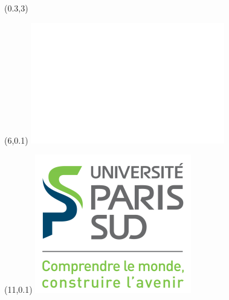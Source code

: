 \documentclass[a4paper]{article}
\newcommand{\NNT}{20XXSACLXXXX} 															%
\newcommand{\vpos}{0.1}																	%
\newcommand{\hpos}{11}																		%
\newcommand{\vpostt}{0.1} 																	%
\newcommand{\hpostt}{6}																	%
\begin{document}
	
	
	\begin{textblock}{1}(0.3,3)
		\Large{\rotatebox{90}{\color{white}{NNT : \NNT}}}
	\end{textblock}
	
	
	
	
	\begin{textblock}{1}(\hpostt,\vpostt)
		\includegraphics[scale=1]{media/etab/blank.png}
	\end{textblock}
	
	\begin{textblock}{1}(\hpos,\vpos)
		\includegraphics[scale=1]{media/etab/UPSUD.png}	
	\end{textblock}
	
\end{document}
